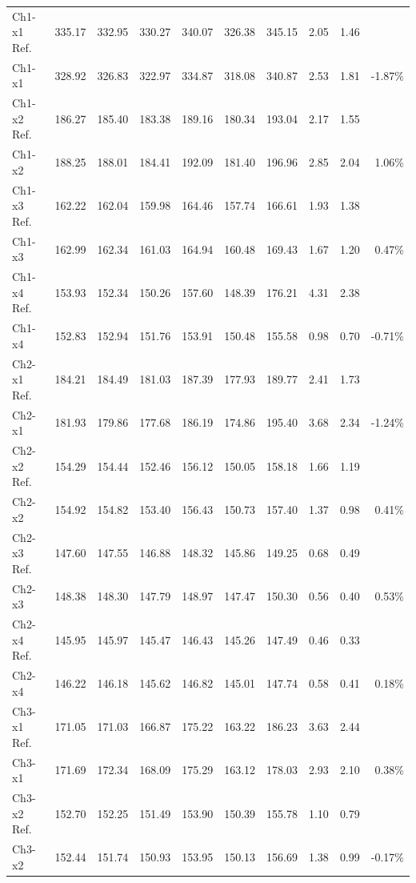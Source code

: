 \begin{table}[htbp]
\begin{center}
\begin{tabular}{
			l
			S[table-format=3.2]
			S[table-format=3.2]
			S[table-format=3.2]
			S[table-format=3.2]
			S[table-format=3.2]
			S[table-format=3.2]
			S[table-format=1.2]
			S[table-format=1.2]
			r}
		Ch1-x1 Ref. & 335.17  & 332.95  & 330.27  & 340.07  & 326.38  & 345.15  & 2.05  & 1.46 & \\
		Ch1-x1 & 328.92  & 326.83  & 322.97  & 334.87  & 318.08  & 340.87  & 2.53  & 1.81 & -1.87\% \\
		Ch1-x2 Ref. & 186.27  & 185.40  & 183.38  & 189.16  & 180.34  & 193.04  & 2.17  & 1.55 & \\
		Ch1-x2 & 188.25  & 188.01  & 184.41  & 192.09  & 181.40  & 196.96  & 2.85  & 2.04 & 1.06\% \\
		Ch1-x3 Ref. & 162.22  & 162.04  & 159.98  & 164.46  & 157.74  & 166.61  & 1.93  & 1.38 & \\
		Ch1-x3 & 162.99  & 162.34  & 161.03  & 164.94  & 160.48  & 169.43  & 1.67  & 1.20 & 0.47\% \\
		Ch1-x4 Ref. & 153.93  & 152.34  & 150.26  & 157.60  & 148.39  & 176.21  & 4.31  & 2.38 & \\
		Ch1-x4 & 152.83  & 152.94  & 151.76  & 153.91  & 150.48  & 155.58  & 0.98  & 0.70 & -0.71\% \\	
		Ch2-x1 Ref. & 184.21  & 184.49  & 181.03  & 187.39  & 177.93  & 189.77  & 2.41  & 1.73 & \\
		Ch2-x1 & 181.93  & 179.86  & 177.68  & 186.19  & 174.86  & 195.40  & 3.68  & 2.34 & -1.24\% \\
		Ch2-x2 Ref. & 154.29  & 154.44  & 152.46  & 156.12  & 150.05  & 158.18  & 1.66  & 1.19  & \\
		Ch2-x2 & 154.92  & 154.82  & 153.40  & 156.43  & 150.73  & 157.40  & 1.37  & 0.98 & 0.41\% \\
		Ch2-x3 Ref. & 147.60  & 147.55  & 146.88  & 148.32  & 145.86  & 149.25  & 0.68  & 0.49 & \\
		Ch2-x3 & 148.38  & 148.30  & 147.79  & 148.97  & 147.47  & 150.30  & 0.56  & 0.40 & 0.53\% \\
		Ch2-x4 Ref. & 145.95  & 145.97  & 145.47  & 146.43  & 145.26  & 147.49  & 0.46  & 0.33 & \\
		Ch2-x4 & 146.22  & 146.18  & 145.62  & 146.82  & 145.01  & 147.74  & 0.58  & 0.41 & 0.18\% \\
		Ch3-x1 Ref. & 171.05  & 171.03  & 166.87  & 175.22  & 163.22  & 186.23  & 3.63  & 2.44 & \\
		Ch3-x1 & 171.69  & 172.34  & 168.09  & 175.29  & 163.12  & 178.03  & 2.93  & 2.10 & 0.38\% \\
		Ch3-x2 Ref. & 152.70  & 152.25  & 151.49  & 153.90  & 150.39  & 155.78  & 1.10  & 0.79 & \\
		Ch3-x2 & 152.44  & 151.74  & 150.93  & 153.95  & 150.13  & 156.69  & 1.38  & 0.99 & -0.17\% \\

\end{tabular}
\end{center}
\end{table}
